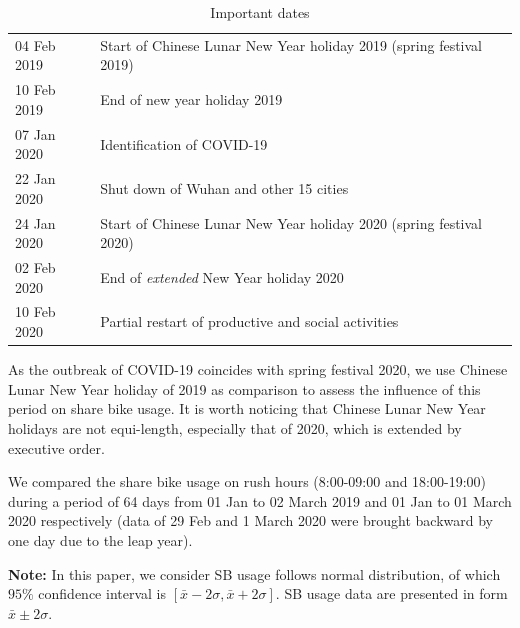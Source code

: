 \documentclass[preprints,ijgi,submit,moreauthors]{Definitions/mdpi}
\begin{document}
\begin{table}[H]
    \centering
    \begin{tabular}{ll}
    04 Feb 2019 & Start of Chinese Lunar New Year holiday 2019 (spring festival 2019) \\
    10 Feb 2019 & End of new year holiday 2019\\
    07 Jan 2020 & Identification of COVID-19\\
    22 Jan 2020 & Shut down of Wuhan and other 15 cities\\
    24 Jan 2020 & Start of Chinese Lunar New Year holiday 2020 (spring festival 2020)\\
    02 Feb 2020 & End of \textit{extended} New Year holiday 2020\\
    10 Feb 2020 & Partial restart of productive and social activities
    \end{tabular}
    \caption{Important dates}
    \label{tab:my_label}
\end{table}

As the outbreak of COVID-19 coincides with spring festival 2020, we use Chinese Lunar New Year holiday of 2019 as comparison to assess the influence of this period on share bike usage.
It is worth noticing that Chinese Lunar New Year holidays are not equi-length, especially that of 2020, which is extended by executive order.

We compared the share bike usage on rush hours (8:00-09:00 and 18:00-19:00) during a period of 64 days from 01 Jan to 02 March 2019 and 01 Jan to 01 March 2020 respectively (data of 29 Feb and 1 March 2020 were brought backward by one day due to the leap year).

\textbf{Note:} In this paper, we consider SB usage follows normal distribution, of which $95\%$ confidence interval is $[\bar{x}-2\sigma,\bar{x}+2\sigma]$.
SB usage data are presented in form $\bar{x}\pm2\sigma$.
\end{document}
